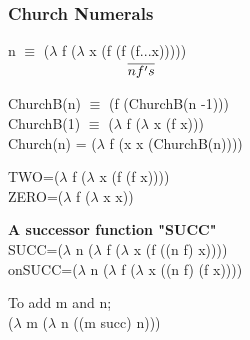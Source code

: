 \documentclass{article}
\newcommand\tab[1][1cm]{\hspace*{#1}}
\begin{document}
\begin{flushleft}
\subsubsection*{Church Numerals}
\begin{flushleft}
n $\equiv$ ($\lambda$ f ($\lambda$ x (f (f (f...x)))))\\
$\tab{\tab{\tab{\overline{n f's}}}}$
\end{flushleft}

\begin{flushleft}
ChurchB(n) $\equiv$ (f (ChurchB(n -1)))\\
ChurchB(1) $\equiv$ ($\lambda$ f ($\lambda$ x (f x)))\\
\bigskip
Church(n) = ($\lambda$ f (x x (ChurchB(n))))\\
\end{flushleft}

\begin{flushleft}
TWO=($\lambda$ f ($\lambda$ x (f (f x))))\\
ZERO=($\lambda$ f ($\lambda$ x x))\\
\end{flushleft}
\bigskip
\begin{flushleft}
\textbf{A successor function "SUCC"}\\
SUCC=($\lambda$ n ($\lambda$ f ($\lambda$ x (f ((n f) x))))\\
onSUCC=($\lambda$ n ($\lambda$ f ($\lambda$ x ((n f) (f x))))
\end{flushleft}

\begin{flushleft}
To add m and n;\\
($\lambda$ m ($\lambda$ n ((m succ) n)))
\end{flushleft}
\end{flushleft}
\end{document}

